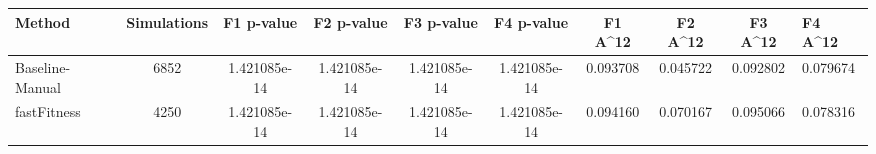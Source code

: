 \begin{tabular}{lcccccccc}
\toprule
         Method &  Simulations &   F1 p-value &   F2 p-value &   F3 p-value &   F4 p-value &  F1 A^12 &  F2 A^12 &  F3 A^12 &  F4 A^12 \\
\midrule
Baseline-Manual &         6852 & 1.421085e-14 & 1.421085e-14 & 1.421085e-14 & 1.421085e-14 & 0.093708 & 0.045722 & 0.092802 & 0.079674 \\
    fastFitness &         4250 & 1.421085e-14 & 1.421085e-14 & 1.421085e-14 & 1.421085e-14 & 0.094160 & 0.070167 & 0.095066 & 0.078316 \\
\bottomrule
\end{tabular}

